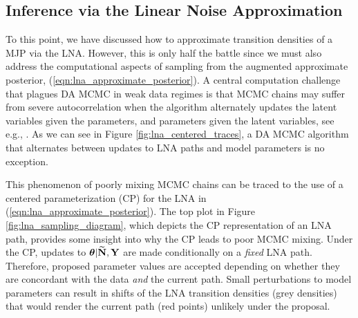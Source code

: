 \subsection{Inference via the Linear Noise Approximation}
\label{subsec:lna_inference}

To this point, we have discussed how to approximate transition densities of a MJP via the LNA. However, this is only half the battle since we must also address the computational aspects of sampling from the augmented approximate posterior, (\ref{eqn:lna_approximate_posterior}). A central computation challenge that plagues DA MCMC in weak data regimes is that MCMC chains may suffer from severe autocorrelation when the algorithm alternately updates the latent variables given the parameters, and parameters given the latent variables, see e.g., \cite{bernardo2003non,papaspiliopoulos2003noncentered,papaspiliopoulos2007general,yu2011center}. As we can see in Figure \ref{fig:lna_centered_traces}, a DA MCMC algorithm that alternates between updates to LNA paths and model parameters is no exception.

This phenomenon of poorly mixing MCMC chains can be traced to the use of a centered parameterization (CP) for the LNA in (\ref{eqn:lna_approximate_posterior}). The top plot in Figure \ref{fig:lna_sampling_diagram}, which depicts the CP representation of an LNA path, provides some insight into why the CP leads to poor MCMC mixing. Under the CP, updates to $ \boldsymbol{\theta}|\widetilde{\mathbf{N}},\mathbf{Y} $ are made conditionally on a \textit{fixed} LNA path. Therefore, proposed parameter values are accepted depending on whether they are concordant with the data \textit{and} the current path. Small perturbations to model parameters can result in shifts of the LNA transition densities (grey densities) that would render the current path (red points) unlikely under the proposal. 

